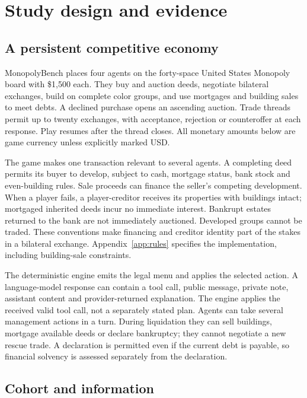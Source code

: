 \section{Study design and evidence}
\label{sec:setup}

\subsection{A persistent competitive economy}

MonopolyBench places four agents on the forty-space United States Monopoly board with \$1,500 each. They buy and auction deeds, negotiate bilateral exchanges, build on complete color groups, and use mortgages and building sales to meet debts. A declined purchase opens an ascending auction. Trade threads permit up to twenty exchanges, with acceptance, rejection or counteroffer at each response. Play resumes after the thread closes. All monetary amounts below are game currency unless explicitly marked USD.

The game makes one transaction relevant to several agents. A completing deed permits its buyer to develop, subject to cash, mortgage status, bank stock and even-building rules. Sale proceeds can finance the seller's competing development. When a player fails, a player-creditor receives its properties with buildings intact; mortgaged inherited deeds incur no immediate interest. Bankrupt estates returned to the bank are not immediately auctioned. Developed groups cannot be traded. These conventions make financing and creditor identity part of the stakes in a bilateral exchange. Appendix~\ref{app:rules} specifies the implementation, including building-sale constraints.

The deterministic engine emits the legal menu and applies the selected action. A language-model response can contain a tool call, public message, private note, assistant content and provider-returned explanation. The engine applies the received valid tool call, not a separately stated plan. Agents can take several management actions in a turn. During liquidation they can sell buildings, mortgage available deeds or declare bankruptcy; they cannot negotiate a new rescue trade. A declaration is permitted even if the current debt is payable, so financial solvency is assessed separately from the declaration.

\subsection{Cohort and information}

